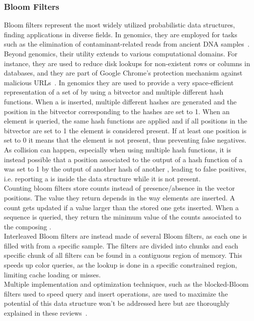 \subsubsection{Bloom Filters}
\label{sec:bloom_filters}
Bloom filters represent the most widely utilized probabilistic data structures, finding applications in diverse fields. In genomics, they are employed for tasks such as the elimination of contaminant-related reads from ancient DNA samples~\cite{akmerbroom}. Beyond genomics, their utility extends to various computational domains. For instance, they are used to reduce disk lookups for non-existent rows or columns in databases, and they are part of Google Chrome's protection mechanism against malicious URLs~\cite{dbbf,chromebf}. In genomics they are used to provide a very space-efficient representation of a set of \kmers by using a bitvector and multiple different hash functions. When a \kmer is inserted, multiple different hashes are generated and the position in the bitvector corresponding to the hashes are set to 1. When an element is queried, the same hash functions are applied and if all positions in the bitvector are set to 1 the element is considered present. If at least one position is set to 0 it means that the element is not present, thus preventing false negatives. As collision can happen, especially when using multiple hash functions, it is instead possible that a position associated to the output of a hash function of a \kmer was set to 1 by the output of another hash of another \kmer, leading to false positives, i.e. reporting a \kmer is inside the data structure while it is not present.\\
Counting bloom filters store counts instead of presence/absence in the vector positions. The value they return depends in the way elements are inserted. A \kmer count gets updated if a value larger than the stored one gets inserted. When a sequence is queried, they return the minimum value of the counts associated to the composing \kmers.\\
Interleaved Bloom filters are instead made of several Bloom filters, as each one is filled with \kmers from a specific sample. The filters are divided into chunks and each specific chunk of all filters can be found in a contiguous region of memory. This speeds up color queries, as the lookup is done in a specific constrained region, limiting cache loading or misses.\\
Multiple implementation and optimization techniques, such as the blocked-Bloom filters used to speed query and insert operations, are used to maximize the potential of this data structure won't be addressed here but are thoroughly explained in these reviews~\cite{marchet2024kmersets,marchet2021kmer,marchet2024coloredkmersets}. 

